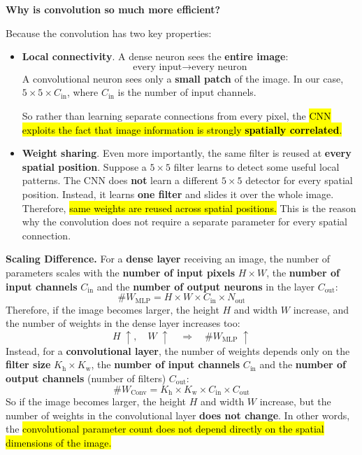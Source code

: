 \highspace
\begin{flushleft}
    \textcolor{Green3}{ \textbf{Why is convolution so much more efficient?}}
\end{flushleft}
Because the convolution has two key properties:
\begin{itemize}
    \item \textbf{Local connectivity}. A dense neuron sees the \textbf{entire image}:
    \begin{equation*}
        \text{every input} \to \text{every neuron}
    \end{equation*}
    A convolutional neuron sees only a \textbf{small patch} of the image. In our case, $5 \times 5 \times C_\text{in}$, where $C_\text{in}$ is the number of input channels.

    So rather than learning separate connections from every pixel, the \hl{CNN exploits the fact that image information is strongly \textbf{spatially correlated}.}


    \item \textbf{Weight sharing}. Even more importantly, the same filter is reused at \textbf{every spatial position}. Suppose a $5 \times 5$ filter learns to detect some useful local patterns. The CNN does \textbf{not} learn a different $5 \times 5$ detector for every spatial position. Instead, it learns \textbf{one filter} and slides it over the whole image. Therefore, \hl{same weights are reused across spatial positions.} This is the reason why the convolution does not require a separate parameter for every spatial connection.
\end{itemize}
\textcolor{DarkOrange3}{ \textbf{Scaling Difference.}} For a \textbf{dense layer} receiving an image, the number of parameters scales with the \textbf{number of input pixels} $H \times W$, the \textbf{number of input channels} $C_\text{in}$ and the \textbf{number of output neurons} in the layer $C_\text{out}$:
\begin{equation*}
    \text{\#} W_{\text{MLP}} = H \times W \times C_\text{in} \times N_\text{out}
\end{equation*}
Therefore, if the image becomes larger, the height $H$ and width $W$ increase, and the number of weights in the dense layer increases too:
\begin{equation*}
    H \; \uparrow, \quad W \; \uparrow \quad \Rightarrow \quad \text{\#} W_{\text{MLP}} \; \uparrow
\end{equation*}
Instead, for a \textbf{convolutional layer}, the number of weights depends only on the \textbf{filter size} $K_{\text{h}} \times K_{\text{w}}$, the \textbf{number of input channels} $C_\text{in}$ and the \textbf{number of output channels} (number of filters) $C_\text{out}$:
\begin{equation*}
    \text{\#} W_{\text{Conv}} = K_{\text{h}} \times K_{\text{w}} \times C_\text{in} \times C_\text{out}
\end{equation*}
So if the image becomes larger, the height $H$ and width $W$ increase, but the number of weights in the convolutional layer \textbf{does not change}. In other words, the \hl{convolutional parameter count does not depend directly on the spatial dimensions of the image.}

